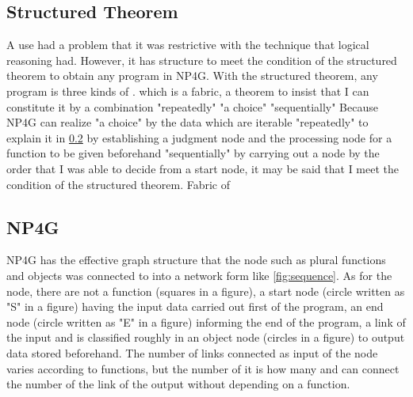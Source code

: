 \documentclass{article}
\begin{document}
\subsection {Structured Theorem}
A use had a problem that it was restrictive with the technique that logical reasoning had.
However, it has structure to meet the condition of the structured theorem to obtain any program in NP4G.
With the structured theorem, any program is three kinds of \cite{StructuredProgramming}. which is a fabric, a theorem to insist that I can constitute it by a combination "repeatedly" "a choice" "sequentially"
Because NP4G can realize "a choice" by the data which are iterable "repeatedly" to explain it in \ref{sec:struct} by establishing a judgment node and the processing node for a function to be given beforehand "sequentially" by carrying out a node by the order that I was able to decide from a start node, it may be said that I meet the condition of the structured theorem.
Fabric of \subsection{NP4G}
\label{sec:struct}
NP4G has the effective graph structure that the node such as plural functions and objects was connected to into a network form like \ref{fig:sequence}.
As for the node, there are not a function (squares in a figure), a start node (circle written as "S" in a figure) having the input data carried out first of the program, an end node (circle written as "E" in a figure) informing the end of the program, a link of the input and is classified roughly in an object node (circles in a figure) to output data stored beforehand.
The number of links connected as input of the node varies according to functions, but the number of it is how many and can connect the number of the link of the output without depending on a function.
\end{document}
